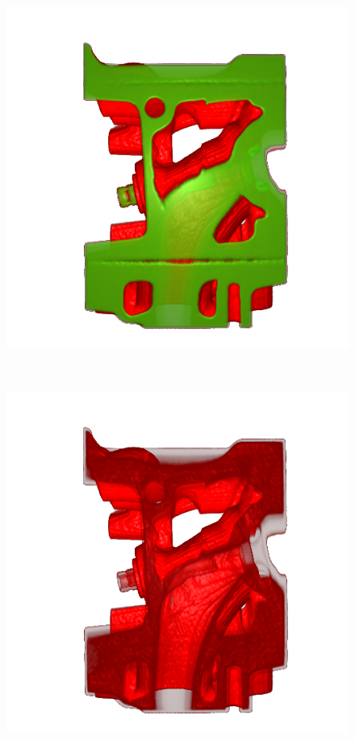 \begin{figure}
	\centering
	\begin{minipage}{.33\textwidth}
		\includegraphics[width=1\linewidth]{images/engine_naive}
	\end{minipage}~
	\begin{minipage}{.33\textwidth}
		\includegraphics[width=1\linewidth]{images/engine_naive_1}

\end{minipage}
\end{figure}
